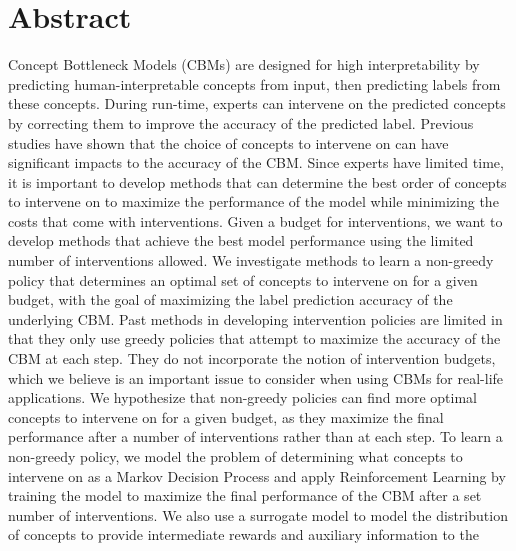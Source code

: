 \documentclass[../main.tex]{subfiles}
\begin{document}
\chapter*{Abstract}




Concept Bottleneck Models (CBMs) are designed for high interpretability by predicting 
human-interpretable concepts from input, 
then predicting labels from these concepts. During run-time, experts can intervene on the 
predicted concepts
by correcting them to improve the accuracy of the predicted label. Previous 
studies have shown that the choice of concepts to intervene on 
can have significant impacts to the accuracy of the CBM.
Since experts have limited time, it is important to develop methods that can 
determine the best order of concepts to intervene on to maximize the performance of the model 
while minimizing the costs that come with interventions. Given a budget
for interventions, we want to develop methods that achieve the best model performance
using the limited number of interventions allowed.
We investigate methods to learn a non-greedy policy that determines an optimal set of 
concepts to intervene on
for a given budget, with the goal of maximizing the label prediction accuracy of the underlying CBM.
Past methods in developing intervention policies are limited in
that they only use greedy policies 
that attempt to maximize the accuracy of the CBM at each step.
They do not incorporate the notion of intervention budgets,
which we believe is an important issue to consider when using CBMs for real-life applications.
We hypothesize that non-greedy policies can find more optimal concepts to intervene on for a 
given budget,
as they maximize the final performance after a number of interventions rather than at each step.
To learn a non-greedy policy, we model the problem of determining what concepts to intervene on
as a Markov Decision Process
and apply Reinforcement Learning by training the model to maximize the final performance of the CBM
after a set number of interventions.
We also use a surrogate model to model the distribution of concepts to provide intermediate rewards and auxiliary information to the
\end{document}
